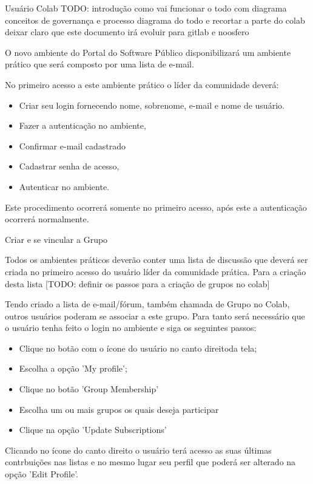 Usuário Colab
TODO: introdução como vai funcionar o todo com diagrama 
conceitos de governança e processo
diagrama do todo e recortar a parte do colab
deixar claro que este documento irá evoluir para gitlab e noosfero

O novo ambiente do Portal do Software Público disponibilizará um ambiente prático
que será composto por uma lista de e-mail.

No primeiro acesso a este ambiente prático o líder da comunidade deverá:

\begin{itemize}
\item Criar seu login fornecendo nome, sobrenome, e-mail e nome de usuário. 
\item Fazer a autenticação no ambiente,
\item Confirmar e-mail cadastrado 
\item Cadastrar senha de acesso, 
\item Autenticar no ambiente. 
\end{itemize}
Este procedimento ocorrerá somente no primeiro acesso, após este a autenticação 
ocorrerá normalmente.

Criar e se vincular a Grupo

Todos os ambientes práticos deverão conter uma lista de discussão que deverá ser criada
no primeiro acesso do usuário líder da comunidade prática. Para a criação desta lista
[TODO: definir os passos para a criação de grupos no  colab]

Tendo criado a lista de e-mail/fórum, também chamada de Grupo no Colab, outros
usuários poderam se associar a este grupo. Para tanto será necessário que o 
usuário tenha feito o login no ambiente e siga os seguintes passos:

\begin{itemize}
\item Clique no botão com o ícone do usuário no canto direitoda tela; 
\item Escolha a opção 'My profile';
\item Clique no botão 'Group Membership'
\item Escolha um ou mais grupos os quais deseja participar
\item Clique na opção 'Update Subscriptions'
\end{itemize}

Clicando no ícone do canto direito o usuário terá acesso as suas últimas contrbuições
nas listas e no mesmo lugar seu perfil que poderá ser alterado na opção 'Edit Profile'.

